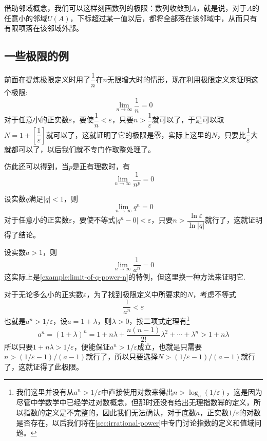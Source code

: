 借助邻域概念，我们可以这样刻画数列的极限：数列收敛到$A$，就是说，对于$A$的任意小的邻域$U(A)$，下标超过某一值以后，都将全部落在该邻域中，从而只有有限项落在该邻域外部。

\subsection{一些极限的例}
\label{sec:some-examples-about-limit-of-number-sequence}

\begin{example}
  \label{example:limit-of-1-devide-by-n-power-p}
  前面在提炼极限定义时用了$\dfrac{1}{n}$在$n$无限增大时的情形，现在利用极限定义来证明这个极限:
  \[ \lim_{n \to \infty} \frac{1}{n} = 0 \]
  对于任意小的正实数$\varepsilon$，要使$\dfrac{1}{n}<\varepsilon$，只要$n>\dfrac{1}{\varepsilon}$就可以了，于是可以取$N=1+\left[ \dfrac{1}{\varepsilon} \right]$就可以了，这就证明了它的极限是零，实际上这里的$N$，只要比$\dfrac{1}{\varepsilon}$大就都可以了，以后我们就不专门作取整处理了。

  仿此还可以得到，当$p$是正有理数时，有
  \[ \lim_{n \to \infty} \frac{1}{n^p} = 0 \]
\end{example}

\begin{example}
  \label{example:limit-of-q-power-n}
  设实数$q$满足$|q|<1$，则
  \[ \lim_{n \to \infty} q^n = 0 \]
  对于任意小的正实数$\varepsilon$，要使不等式$|q^n - 0| < \varepsilon$，只要$n>\dfrac{\ln{\varepsilon}}{\ln{|q|}}$就行了，这就证明得了结论。
\end{example}

\begin{example}
  \label{example:limit-of-1-devide-by-a-power-n}
  设实数$a>1$，则
  \[ \lim_{n \to \infty} \frac{1}{a^n} = 0 \]
  这实际上是\autoref{example:limit-of-q-power-n}的特例，但这里换一种方法来证明它.
  
  对于无论多么小的正实数$\varepsilon$，为了找到极限定义中所要求的$N$，考虑不等式
  \[ \frac{1}{a^n} < \varepsilon \]
  也就是$a^n>1/\varepsilon$，设$a=1+\lambda$，则$\lambda>0$，按二项式定理有\footnote{我们这里并没有从$a^n>1/\varepsilon$中直接使用对数来得出$n>\log_a{(1/\varepsilon)}$，这是因为尽管中学数学中已经学过对数概念，但那时还没有给出无理指数幂的定义，所以指数的定义是不完整的，因此我们无法确认，对于底数$a$，正实数$1/\varepsilon$的对数是否存在，以后我们将在\autoref{sec:irrational-power}中专门讨论指数的定义和值域问题。}
  \[ a^n = (1+\lambda)^n = 1 + n\lambda + \frac{n(n-1)}{2!}\lambda^2+\cdots+\lambda^n > 1+n \lambda \]
  所以只要$1+n\lambda>1/\varepsilon$，便能保证$a^n>1/\varepsilon$成立，也就是只需要$n > (1/\varepsilon-1) / (a-1)$就行了，所以只要选择$N>(1/\varepsilon-1)/(a-1)$就行了，这就证得了此极限。
\end{example}

